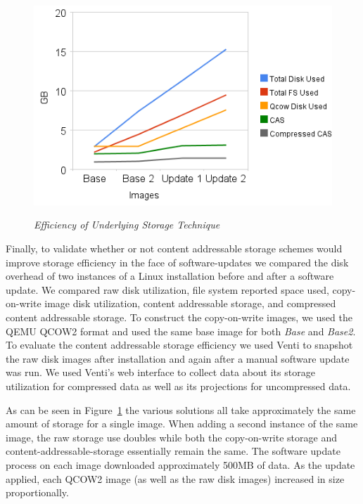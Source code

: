 \begin{figure}[htbp]
\begin{centering}
\resizebox{\columnwidth}{!}
{\includegraphics{venti_analysis}}
\small\itshape
\caption{\small\itshape Efficiency of Underlying Storage Technique}
\label{fig:venti}
\end{centering}
\end{figure}

Finally, to validate whether or not content addressable storage schemes
would improve storage efficiency in the face of software-updates we compared
the disk overhead of two instances of a Linux installation before and after
a software update.  We compared raw disk utilization, file system reported
space used, copy-on-write image disk utilization, content addressable storage,
and compressed content addressable storage.
To construct the copy-on-write images, we used the QEMU QCOW2 format and
used the same base image for both \emph{Base} and \emph{Base2}.
To evaluate the content addressable storage efficiency we used Venti to
snapshot the raw disk images after installation and again after a manual
software update was run.  We used Venti's web interface to collect data about
its storage utilization for compressed data as well as its projections for
uncompressed data.

As can be seen in Figure~\ref{fig:venti} the various solutions all take
approximately the same amount of storage for a single image.  When adding
a second instance of the same image, the raw storage use doubles while both
the copy-on-write storage and content-addressable-storage essentially remain
the same.
The software update process on each image downloaded approximately 500MB of 
data.  As the update applied, each QCOW2 image (as well as the raw disk
images) increased in size proportionally.


